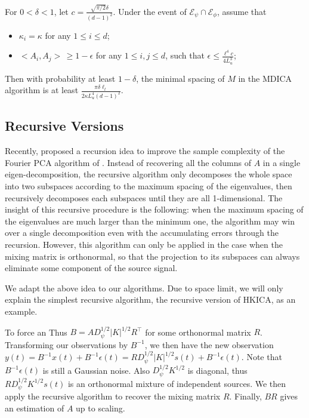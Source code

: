 \documentclass[twoside,11pt]{article}
\newcommand{\Epsi}{\mathcal{E}_{\psi}}
\newcommand{\Ephi}{\mathcal{E}_{\phi}}
\newcommand{\eps}{\epsilon}
\begin{document}
\begin{proposition}
\label{prop:spacingMDICA}
For $0<\delta <1$, let $c = \frac{\sqrt{\pi/2}\delta}{(d-1)^2}$. Under the event of $\Epsi\cap\Ephi$, assume that
\begin{itemize}
\item $\kappa_i = \kappa$ for any $1\le i\le d$;
\item $<A_i, A_j> \,\ge 1-\eps$ for any $1\le i, j \le d$, such that $\eps \le \frac{\ell^4 c}{4L_u^3}$;
\end{itemize}
Then with probability at least $1-\delta$, the minimal spacing of $M$  in the MDICA algorithm is at least $\frac{\pi\delta\ell_l}{2\kappa L_u^4 (d-1)^2}$. 
\end{proposition}

\subsection{Recursive Versions}
Recently, \citet{vempala2014max} proposed a recursion idea to improve the sample complexity of the Fourier PCA algorithm of \citet{goyal2014fourier}. 
Instead of recovering all the columns of $A$ in a single eigen-decomposition, the recursive algorithm only decomposes the whole space into two subspaces according to the maximum spacing of the eigenvalues, 
then recursively decomposes each subspaces until they are all 1-dimensional.
The insight of this recursive procedure is the following: when the maximum spacing of the eigenvalues are much larger than the minimum one, the algorithm may win over a single decomposition even with the accumulating errors through the recursion.
However, this algorithm can only be applied in the case when the mixing matrix is orthonormal, so that the projection to its subspaces can always eliminate some component of the source signal. 

We adapt the above idea to our algorithms. Due to space limit, we will only explain the simplest recursive algorithm, the recursive version of HKICA, as an example.

To force an%
Thus $B = AD_{\psi}^{1/2}|K|^{1/2}R^{\top}$ for some orthonormal matrix $R$. 
Transforming our observations by $B^{-1}$, we then have the new observation $y(t) = B^{-1}x(t) + B^{-1}\eps(t) = RD_{\psi}^{1/2}|K|^{1/2}s(t) + B^{-1}\eps(t)$. 
Note that $B^{-1}\eps(t)$ is still a Gaussian noise. Also $D_{\psi}^{1/2}K^{1/2}$ is diagonal, thus $RD_{\psi}^{1/2}K^{1/2}s(t)$ is an orthonormal mixture of independent sources.
We then apply the recursive algorithm to recover the mixing matrix $R$. Finally, $BR$ gives an estimation of $A$ up to scaling.
\end{document}
